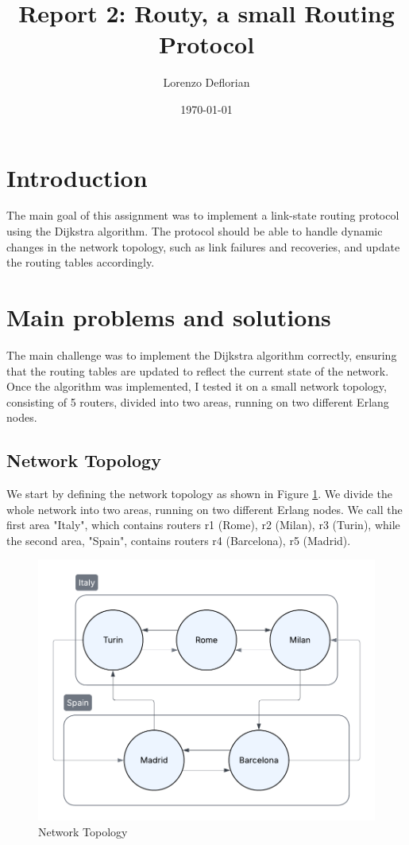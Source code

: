 \documentclass[a4paper, 11pt]{article}
\title{Report 2: Routy, a small Routing Protocol}
\author{Lorenzo Deflorian}
\date{\today{}}
\begin{document}
\maketitle

\section{Introduction}

The main goal of this assignment was to implement a link-state routing protocol using the Dijkstra algorithm. The protocol should be able to handle dynamic changes in the network topology, such as link failures and recoveries, and update the routing tables accordingly. 

\section{Main problems and solutions}

The main challenge was to implement the Dijkstra algorithm correctly, ensuring that the routing tables are updated to reflect the current state of the network. Once the algorithm was implemented, I tested it on a small network topology, consisting of 5 routers, divided into two areas, running on two different Erlang nodes.

\subsection{Network Topology}

We start by defining the network topology as shown in Figure \ref{fig:network_topology}. We divide the whole network into two areas, running on two different Erlang nodes. We call the first area "Italy", which contains routers r1 (Rome), r2 (Milan), r3 (Turin), while the second area, "Spain", contains routers r4 (Barcelona), r5 (Madrid).

\begin{figure}[H]
  \centering
  \includegraphics[width=0.9\linewidth]{network_topology.png}
  \caption{Network Topology}
  \label{fig:network_topology}
\end{figure}
\FloatBarrier
\end{document}
